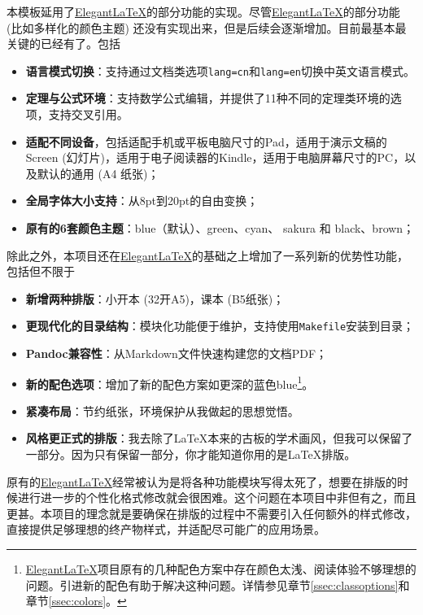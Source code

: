 本模板延用了\href{https://github.com/ElegantLaTeX/}{Elegant\LaTeX}的部分功能的实现。尽管\href{https://github.com/ElegantLaTeX/}{Elegant\LaTeX}的部分功能 (比如多样化的颜色主题) 还没有实现出来，但是后续会逐渐增加。目前最基本最关键的已经有了。包括
\begin{itemize}
  \item \textbf{语言模式切换}：支持通过文档类选项\texttt{lang=cn}和\texttt{lang=en}切换中英文语言模式。
  \item \textbf{定理与公式环境}：支持数学公式编辑，并提供了11种不同的定理类环境的选项，支持交叉引用。
  \item \textbf{适配不同设备}，包括适配手机或平板电脑尺寸的Pad，适用于演示文稿的Screen (幻灯片)，适用于电子阅读器的Kindle，适用于电脑屏幕尺寸的PC，以及默认的通用 (A4 纸张)；
  \item \textbf{全局字体大小支持}：从8pt到20pt的自由变换；
  \item \textbf{原有的6套颜色主题}：\textcolor{elegantblue}{blue}（默认）、\textcolor{elegantgreen}{green}、\textcolor{elegantcyan}{cyan}、 \textcolor{elegantsakura}{sakura} 和 \textcolor{elegantblack}{black}、\textcolor{elegantbrown}{brown}；
\end{itemize}

除此之外，本项目还在\href{https://github.com/ElegantLaTeX/}{Elegant\LaTeX}的基础之上增加了一系列新的优势性功能，包括但不限于
\begin{itemize}
  \item \textbf{新增两种排版}：小开本 (32开A5)，课本 (B5纸张)；
  \item \textbf{更现代化的目录结构}：模块化功能便于维护，支持使用\texttt{Makefile}安装到目录；
  \item \textbf{Pandoc兼容性}：从Markdown文件快速构建您的文档PDF；
  \item \textbf{新的配色选项}：增加了新的配色方案如更深的蓝色\textcolor{eblue}{blue}\footnote{\href{https://github.com/ElegantLaTeX/}{Elegant\LaTeX}项目原有的几种配色方案中存在颜色太浅、阅读体验不够理想的问题。引进新的配色有助于解决这种问题。详情参见章节\ref{ssec:classoptions}和章节\ref{ssec:colors}。}。
  \item \textbf{紧凑布局}：节约纸张，环境保护从我做起的思想觉悟。
  \item \textbf{风格更正式的排版}：我去除了\LaTeX{}本来的古板的学术画风，但我可以保留了一部分。因为只有保留一部分，你才能知道你用的是\LaTeX{}排版。
\end{itemize}

\begin{remark}
  原有的\href{https://github.com/ElegantLaTeX/}{Elegant\LaTeX}经常被认为是将各种功能模块写得太死了，想要在排版的时候进行进一步的个性化格式修改就会很困难。这个问题在本项目中非但有之，而且更甚。本项目的理念就是要确保在排版的过程中不需要引入任何额外的样式修改，直接提供足够理想的终产物样式，并适配尽可能广的应用场景。
\end{remark}